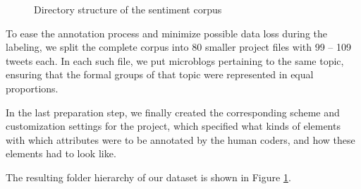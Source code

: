 \begin{figure}
  \begin{minipage}[t][21.5em]{0.5\textwidth}%
    \hspace{3em}

    \vspace{13em}
    \caption{Directory structure of the sentiment
      corpus\label{fig:snt:corpus}}%
  \end{minipage}
\end{figure}

To ease the annotation process and minimize possible data loss during
the labeling, we split the complete corpus into 80 smaller project
files with 99 -- 109 tweets each.  In each such file, we put
microblogs pertaining to the same topic, ensuring that the formal
groups of that topic were represented in equal proportions.

In the last preparation step, we finally created the corresponding
scheme and customization settings for the project, which specified
what kinds of elements with which attributes were to be annotated by
the human coders, and how these elements had to look like.

The resulting folder hierarchy of our dataset is shown in Figure
\ref{fig:snt:corpus}.


